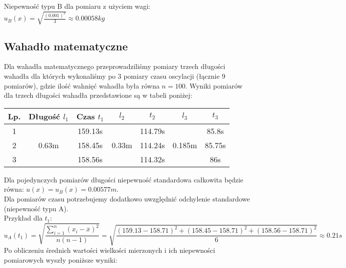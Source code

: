Niepewność typu B dla pomiaru z użyciem wagi: $\displaystyle u_B(x) = \sqrt{ \frac{(0.001)^2}{3} } \approx 0.00058kg$ \\

{\subsection{Wahadło matematyczne}}

Dla wahadła matematycznego przeprowadziliśmy pomiary trzech długości wahadła dla których wykonaliśmy po 3 pomiary czasu oscylacji (łącznie 9 pomiarów),
gdzie ilość wahnięć wahadła była równa $n = 100$.
Wyniki pomiarów dla trzech długości wahadła przedstawione są w tabeli poniżej: \\

\begin{center}
    \begin{tabular}[h]{|c|c|c||c|c||c|c|}
        \hline
        Lp. & Długość $l_1$             & Czas $t_1$             & $l_2$                  & $t_2$   & $l_3$                   & $t_3$ \\
        \hline
        1 & \multirow{3}{*}{0.63m}      & 159.13s                & \multirow{3}{*}{0.33m} & 114.79s & \multirow{3}{*}{0.185m} & 85.8s \\
        2 &                             & 158.45s                &                        & 114.24s &                         & 85.75s \\
        3 &                             & 158.56s                &                        & 114.32s &                         & 86s \\ 
        \hline
    \end{tabular}
\end{center}

Dla pojedynczych pomiarów długości niepewność standardowa całkowita będzie równa: $u(x) = u_B(x) = 0.00577m$. \\
Dla pomiarów czasu potrzebujemy dodatkowo uwzględnić odchylenie standardowe (niepewność typu A). \\
\indent Przykład dla $t_1$:
$$
u_A(t_1) = \sqrt{\frac{ \displaystyle \sum_{i=1}^{n}(x_i - \overline{x})^2 }{n(n-1)}}
= \sqrt{\frac{(159.13 - 158.71)^2 + (158.45 - 158.71)^2 + (158.56 - 158.71)^2}{6}} \approx 0.21s
$$
Po obliczeniu średnich wartości wielkości mierzonych i ich niepewności pomiarowych wyszły poniższe wyniki:

